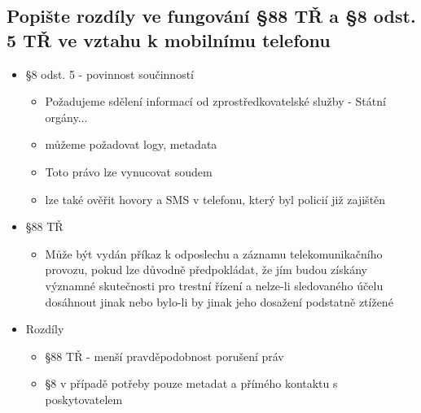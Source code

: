 \subsection{Popište rozdíly ve fungování §88 TŘ a §8 odst. 5 TŘ ve vztahu k mobilnímu telefonu}
\begin{itemize}
    \item §8 odst. 5 - povinnost součinností
    \begin{itemize}
        \item Požadujeme sdělení informací od zprostředkovatelské služby - Státní orgány...
        \item můžeme požadovat logy, metadata
        \item Toto právo lze vynucovat soudem
        \item lze také ověřit hovory a SMS v telefonu, který byl policií již zajištěn\\
    \end{itemize}
   
    \item §88 TŘ
    \begin{itemize}
        \item Může být vydán příkaz k odposlechu a záznamu telekomunikačního provozu, pokud lze důvodně předpokládat, že jím budou získány významné skutečnosti pro trestní řízení a nelze-li sledovaného účelu dosáhnout jinak nebo bylo-li by jinak jeho dosažení podstatně ztížené
    \end{itemize}
    \item Rozdíly
    \begin{itemize}
        \item §88 TŘ - menší pravděpodobnost porušení práv
        \item §8 v případě potřeby pouze metadat a přímého kontaktu s poskytovatelem
    \end{itemize}
\end{itemize}

